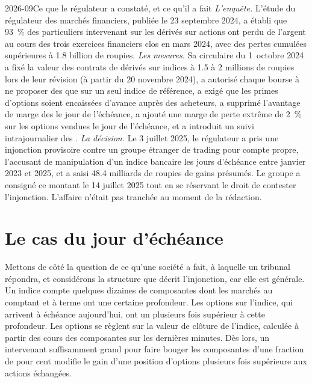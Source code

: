 \begin{dated}{2026-09}{Ce que le régulateur a constaté, et ce qu'il a fait}\label{dat:m1:options-markets-europe-asia:sebi}
\emph{L'enquête.} L'étude du régulateur des marchés financiers, publiée le 23 septembre
2024, a établi que 93~\% des particuliers intervenant sur les dérivés sur actions ont perdu de l'argent
au cours des trois exercices financiers clos en mars 2024, avec des pertes cumulées supérieures
à 1.8 billion de roupies.
\emph{Les mesures.} Sa circulaire du 1~octobre 2024 a fixé la valeur des contrats de dérivés
sur indices à 1.5 à 2 millions de roupies lors de leur révision (à partir du 20 novembre
2024), a autorisé chaque bourse à ne proposer des  que sur un seul indice de référence,
a exigé que les primes d'options soient encaissées d'avance auprès des acheteurs, a supprimé
l'avantage de marge des  le jour de l'échéance, a ajouté une marge de perte extrême de 2~\%
sur les options vendues le jour de l'échéance, et a introduit un suivi intrajournalier des
.
\emph{La décision.} Le 3 juillet 2025, le régulateur a pris une injonction provisoire contre
un groupe étranger de trading pour compte propre, l'accusant de manipulation d'un indice bancaire les
jours d'échéance entre janvier 2023 et 2025, et a saisi 48.4 milliards de roupies
de gains présumés. Le groupe a consigné ce montant le 14 juillet 2025 tout en
se réservant le droit de contester l'injonction. L'affaire n'était pas tranchée au
moment de la rédaction.
\end{dated}

\section{Le cas du jour d'échéance}

Mettons de côté la question de ce qu'une société a fait, à laquelle un tribunal répondra,
et considérons la structure que décrit l'injonction, car elle est générale.
Un indice compte quelques dizaines de composantes dont les marchés au comptant et à terme ont une
certaine profondeur. Les options sur l'indice, qui arrivent à échéance aujourd'hui, ont un 
plusieurs fois supérieur à cette profondeur. Les options se règlent sur la valeur de clôture de l'indice,
calculée à partir des cours des composantes sur les dernières minutes. Dès lors, un
intervenant suffisamment grand pour faire bouger les composantes d'une fraction de pour cent
modifie le gain d'une position d'options plusieurs fois supérieure aux actions
échangées.

